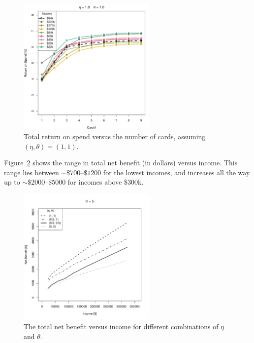 \begin{figure}[tbh]
    \begin{center}
    \includegraphics[width=0.6\textwidth]{../Figures/ROSvsKvsIncome_1_1.pdf}
    \caption{Total return on spend versus the number of cards, assuming $(\eta, \theta) = (1,1)$.}
    \label{fig:ROSvsKvsIncome_1_1}
    \end{center}
\end{figure}

\clearpage
Figure~\ref{fig:NBvsIncome} shows the range in total net benefit (in dollars) versus income.  
This range lies between $\sim\$700$--$\$1200$ for the lowest incomes, and increases all the way up to $\sim\$2000$--$\$5000$ for incomes above \$300k.

\begin{figure}[t!bh]
    \begin{center}
    \includegraphics[width=0.6\textwidth]{../Figures/NBvsIncome_K5.pdf}
    \caption{The total net benefit versus income for different combinations of $\eta$ and $\theta$. }
    \label{fig:NBvsIncome}
    \end{center}
\end{figure}

